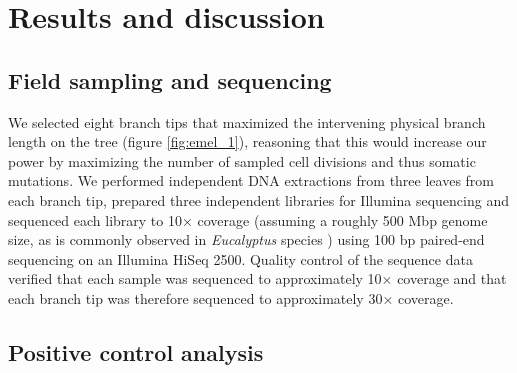 \section{Results and discussion}

\subsection{Field sampling and sequencing}

We selected eight branch tips that maximized the intervening physical branch length on the tree (figure \ref{fig:emel_1}), reasoning that this would increase our power by maximizing the number of sampled cell divisions and thus somatic mutations. We performed independent DNA extractions from three leaves from each branch tip, prepared three independent libraries for Illumina sequencing and sequenced each library to 10× coverage (assuming a roughly 500 Mbp genome size, as is commonly observed in \textit{Eucalyptus} species \parencite{grattapaglia_progress_2012}) using 100 bp paired-end sequencing on an Illumina HiSeq 2500. Quality control of the sequence data verified that each sample was sequenced to approximately 10× coverage and that each branch tip was therefore sequenced to approximately 30× coverage.

\subsection{Positive control analysis}

